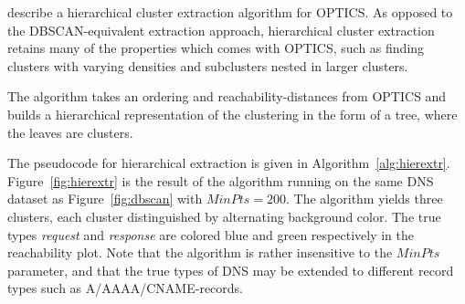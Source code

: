 \documentclass[a4paper]{report}
\begin{document}
\citet{sander03} describe a hierarchical cluster extraction algorithm for
OPTICS. As opposed to the DBSCAN-equivalent extraction approach, hierarchical
cluster extraction retains many of the properties which comes with OPTICS,
such as finding clusters with varying densities and subclusters nested in larger
clusters.

The algorithm takes an ordering and reachability-distances from OPTICS and
builds a hierarchical representation of the clustering in the form of a tree,
where the leaves are clusters.

The pseudocode for hierarchical extraction is given in
Algorithm~\ref{alg:hierextr}. Figure~\ref{fig:hierextr} is the result of
the algorithm running on the same DNS dataset as Figure~\ref{fig:dbscan}
with $MinPts = 200$. The algorithm yields three clusters, each cluster
distinguished by alternating background color. The true types \emph{request} and
\emph{response} are colored blue and green respectively in the reachability
plot. Note that the algorithm is rather insensitive to the $MinPts$ parameter,
and that the true types of DNS may be extended to different record types such
as A/AAAA/CNAME-records.
\\
\end{document}
